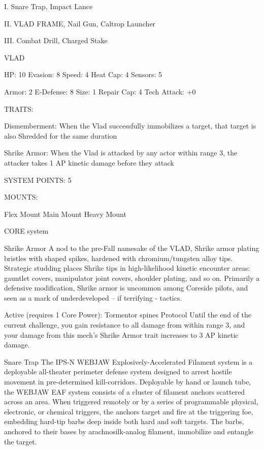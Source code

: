 I. Snare Trap, Impact Lance
 
II. VLAD FRAME, Nail Gun, Caltrop Launcher
 
III. Combat Drill, Charged Stake
 

                                                       VLAD 

  HP: 10          Evasion: 8                              Speed: 4            Heat Cap: 4         Sensors: 5 

  Armor: 2        E-Defense: 8                            Size: 1             Repair Cap: 4       Tech Attack:  
                                                                                                  +0 

                                                      TRAITS: 

  Dismemberment: When the Vlad successfully immobilizes a target, that target is also Shredded for the  
  same duration
 
  Shrike Armor: When the Vlad is attacked by any actor within range 3, the attacker takes 1 AP kinetic  
  damage before they attack 

                                                SYSTEM POINTS: 5 

                                                      MOUNTS: 

  Flex Mount                          Main Mount                               Heavy Mount 

                                                   CORE system 

                                                    Shrike Armor 
  A nod to the pre-Fall namesake of the VLAD, Shrike armor plating bristles with shaped spikes, hardened 
  with chromium/tungsten alloy tips. Strategic studding places Shrike tips in high-likelihood kinetic 
  encounter areas: gauntlet covers, manipulator joint covers, shoulder plating, and so on. Primarily a 
  defensive modification, Shrike armor is uncommon among Coreside pilots, and seen as a mark of 
  underdeveloped -- if terrifying - tactics. 

  Active (requires 1 Core Power): 
  Tormentor spines 
  Protocol 
  Until the end of the current challenge, you gain resistance to all damage from within range 3, and your 
  damage from this mech’s Shrike Armor trait increases to 3 AP kinetic damage. 

Snare Trap  
The IPS-N WEBJAW Explosively-Accelerated Filament system is a deployable all-theater perimeter  
defense system designed to arrest hostile movement in pre-determined kill-corridors. Deployable by hand  
or launch tube, the WEBJAW EAF system consists of a cluster of filament anchors scattered across an  
area. When triggered remotely or by a series of programmable physical, electronic, or chemical triggers, the  
anchors target and fire at the triggering foe, embedding hard-tip barbs deep inside both hard and soft  
targets. The barbs, anchored to their bases by arachnosilk-analog filament, immobilize and entangle the  
target.  

